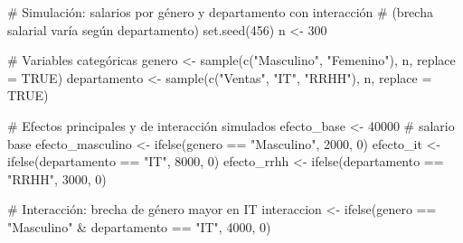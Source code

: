 \documentclass[
  letterpaper,
  DIV=11,
  numbers=noendperiod]{scrreprt}
\newenvironment{Shaded}{\begin{snugshade}}{\end{snugshade}}
\newcommand{\AttributeTok}[1]{\textcolor[rgb]{0.40,0.45,0.13}{#1}}
\newcommand{\CommentTok}[1]{\textcolor[rgb]{0.37,0.37,0.37}{#1}}
\newcommand{\ConstantTok}[1]{\textcolor[rgb]{0.56,0.35,0.01}{#1}}
\newcommand{\DecValTok}[1]{\textcolor[rgb]{0.68,0.00,0.00}{#1}}
\newcommand{\FunctionTok}[1]{\textcolor[rgb]{0.28,0.35,0.67}{#1}}
\newcommand{\NormalTok}[1]{\textcolor[rgb]{0.00,0.23,0.31}{#1}}
\newcommand{\OtherTok}[1]{\textcolor[rgb]{0.00,0.23,0.31}{#1}}
\newcommand{\SpecialCharTok}[1]{\textcolor[rgb]{0.37,0.37,0.37}{#1}}
\newcommand{\StringTok}[1]{\textcolor[rgb]{0.13,0.47,0.30}{#1}}
\begin{document}
\begin{tcolorbox}[enhanced jigsaw, leftrule=.75mm, breakable, colbacktitle=quarto-callout-tip-color!10!white, bottomrule=.15mm, colframe=quarto-callout-tip-color-frame, toprule=.15mm, colback=white, coltitle=black, bottomtitle=1mm, left=2mm, title=\textcolor{quarto-callout-tip-color}{\faLightbulb}\hspace{0.5em}{Ejemplo: Interacción género-departamento en salarios}, opacityback=0, arc=.35mm, opacitybacktitle=0.6, toptitle=1mm, titlerule=0mm, rightrule=.15mm]

\begin{Shaded}
\begin{Highlighting}[]
\CommentTok{\# Simulación: salarios por género y departamento con interacción}
\CommentTok{\# (brecha salarial varía según departamento)}
\FunctionTok{set.seed}\NormalTok{(}\DecValTok{456}\NormalTok{)}
\NormalTok{n }\OtherTok{\textless{}{-}} \DecValTok{300}

\CommentTok{\# Variables categóricas}
\NormalTok{genero }\OtherTok{\textless{}{-}} \FunctionTok{sample}\NormalTok{(}\FunctionTok{c}\NormalTok{(}\StringTok{"Masculino"}\NormalTok{, }\StringTok{"Femenino"}\NormalTok{), n, }\AttributeTok{replace =} \ConstantTok{TRUE}\NormalTok{)}
\NormalTok{departamento }\OtherTok{\textless{}{-}} \FunctionTok{sample}\NormalTok{(}\FunctionTok{c}\NormalTok{(}\StringTok{"Ventas"}\NormalTok{, }\StringTok{"IT"}\NormalTok{, }\StringTok{"RRHH"}\NormalTok{), n, }\AttributeTok{replace =} \ConstantTok{TRUE}\NormalTok{)}

\CommentTok{\# Efectos principales y de interacción simulados}
\NormalTok{efecto\_base }\OtherTok{\textless{}{-}} \DecValTok{40000}  \CommentTok{\# salario base}
\NormalTok{efecto\_masculino }\OtherTok{\textless{}{-}} \FunctionTok{ifelse}\NormalTok{(genero }\SpecialCharTok{==} \StringTok{"Masculino"}\NormalTok{, }\DecValTok{2000}\NormalTok{, }\DecValTok{0}\NormalTok{)}
\NormalTok{efecto\_it }\OtherTok{\textless{}{-}} \FunctionTok{ifelse}\NormalTok{(departamento }\SpecialCharTok{==} \StringTok{"IT"}\NormalTok{, }\DecValTok{8000}\NormalTok{, }\DecValTok{0}\NormalTok{)}
\NormalTok{efecto\_rrhh }\OtherTok{\textless{}{-}} \FunctionTok{ifelse}\NormalTok{(departamento }\SpecialCharTok{==} \StringTok{"RRHH"}\NormalTok{, }\DecValTok{3000}\NormalTok{, }\DecValTok{0}\NormalTok{)}

\CommentTok{\# Interacción: brecha de género mayor en IT}
\NormalTok{interaccion }\OtherTok{\textless{}{-}} \FunctionTok{ifelse}\NormalTok{(genero }\SpecialCharTok{==} \StringTok{"Masculino"} \SpecialCharTok{\&}\NormalTok{ departamento }\SpecialCharTok{==} \StringTok{"IT"}\NormalTok{, }\DecValTok{4000}\NormalTok{, }\DecValTok{0}\NormalTok{)}


\end{Highlighting}
\end{Shaded}
\end{tcolorbox}
\end{document}
